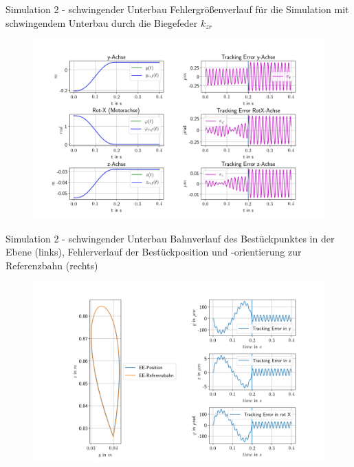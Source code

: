 \documentclass[10pt,xcolor=dvipsnames]{beamer}
\begin{document}
	\begin{frame}{Simulation 2 - schwingender Unterbau}
		Fehlergrößenverlauf für die Simulation mit schwingendem Unterbau durch die Biegefeder $ k_{zr} $
		\vspace{-0.2cm}
		\begin{figure}
			\includegraphics[width=0.99\linewidth]{./pics/posVerlaufAchsen_nurZ.png}
		\end{figure}
	\end{frame}

	\begin{frame}{Simulation 2 - schwingender Unterbau}
		Bahnverlauf des Bestückpunktes in der Ebene (links), Fehlerverlauf der Bestückposition und -orientierung zur Referenzbahn (rechts)
		\vspace{-0.2cm}
		\begin{figure}
		\includegraphics[width=0.999\linewidth]{./pics/endeffektor_nurZ.png}
		\end{figure}
	\end{frame}
\end{document}
